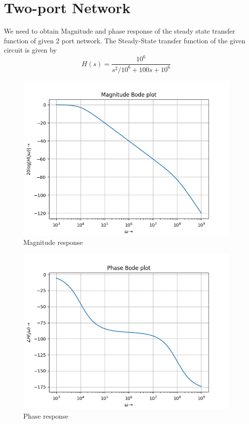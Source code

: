 \documentclass[11pt, a4paper]{article}
\begin{document}
\section{Two-port Network}
We need to obtain Magnitude and phase response of the steady state transfer function of given 2 port network.
The Steady-State transfer function of the given circuit is given by
\begin{equation}
    H(s) = \frac{10^6}{s^2/10^6 + 100s + 10^6}
\end{equation}
  \begin{figure}[!tbh]
    \centering
    \includegraphics[scale=0.5]{Magnitude.png}  
    \caption{Magnitude response} 
    \label{fig:fig5}
  \end{figure}
  \begin{figure}[!tbh]
    \centering
    \includegraphics[scale=0.5]{Phase.png}  
    \caption{Phase response} 
    \label{fig:fig6}
  \end{figure}
\end{document}
